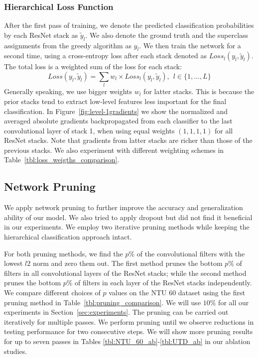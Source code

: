 \documentclass{article}
\begin{document}
\subsubsection{Hierarchical Loss Function}
{After the first pass of training, we denote the predicted classification probabilities by each ResNet stack as $\tilde{y}_l$. We also denote the ground truth and the superclass assignments from the greedy algorithm as $y_l$. We then train the network for a second time, using a cross-entropy loss after each stack denoted as $Loss_{l}(y_{l}, \tilde{y}_l)$. The total loss is a weighted sum of the loss for each stack:
\begin{equation}\label{loss}
    Loss(y_{l}, \tilde{y}_l) = \sum_{l}w_l \times Loss_{l}(y_{l}, \tilde{y}_l), \hspace{5pt} l \in \{1,...,L\}
\end{equation}
Generally speaking, we use bigger weights $w_l$ for latter stacks. This is because the prior stacks tend to extract low-level features less important for the final classification. In Figure~\ref{fig:level-1gradients} we show the normalized and averaged absolute gradients backpropagated from each classifier to the last convolutional layer of stack 1, when using equal weights $(1,1,1,1)$ for all ResNet stacks. Note that gradients from latter stacks are richer than those of the previous stacks. We also experiment with different weighting schemes in Table~\ref{tbl:loss_weigths_comparison}.}

\subsection{Network Pruning}
\label{sec:prunning}

{We apply network pruning to further improve the accuracy and generalization ability of our model. We also tried to apply dropout but did not find it beneficial in our experiments. We employ two iterative pruning methods while keeping the hierarchical classification approach intact. } 

{For both pruning methods, we find the $p\%$ of the convolutional filters with the lowest $l2$ norm and zero them out. The first method prunes the bottom $p\%$ of filters in all convolutional layers of the ResNet stacks; while the second method prunes the bottom $p\%$ of filters in each layer of the ResNet stacks independently. We compare different choices of $p$ values on the NTU 60 dataset using the first pruning method in Table~\ref{tbl:pruning_comparison}. We will use $10\%$ for all our experiments in Section~\ref{sec:experiments}. The pruning can be carried out iteratively for multiple passes. We perform pruning until we observe reductions in testing performance for two consecutive steps. We will show more pruning results for up to seven passes in Tables \ref{tbl:NTU_60_ab}-\ref{tbl:UTD_ab} in our ablation studies.}
\end{document}
